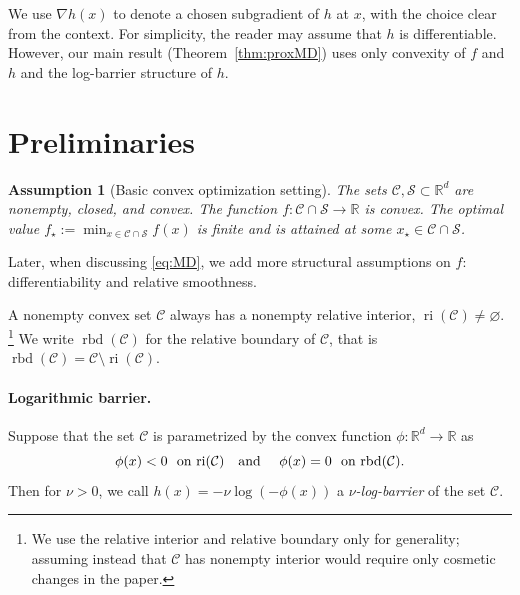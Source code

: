 \documentclass[a4paper]{article}
\newcommand{\CC}{\mathcal{C}}
\renewcommand{\SS}{\mathcal{S}}
\newcommand{\coloneqq}{:=}
\newcommand{\R}{\mathbb{R}}
\DeclareMathOperator{\ri}{ri}
\DeclareMathOperator{\rbd}{rbd}
\newtheorem{assumption}{Assumption}
\begin{document}
We use $\nabla h(x)$ to denote a chosen subgradient of $h$ at $x$, with the choice clear from the context.
For simplicity, the reader may assume that $h$ is differentiable.
However, our main result (Theorem~\ref{thm:proxMD}) uses only convexity of $f$ and $h$ and the log-barrier structure of $h$.

\section{Preliminaries}\label{sec:preliminaries}

\begin{assumption}[Basic convex optimization setting]\label{ass:basic}
        The sets \(\CC, \SS \subset\R^d\) are nonempty, closed, and convex.
        The function \(f\colon \CC \cap \SS \to\R\) is convex.
        The optimal value \(f_\star\coloneqq \min_{x\in\CC\cap \SS} f(x)\)
        is finite and is attained at some \(x_\star\in\CC\cap \SS\).
\end{assumption}
Later, when discussing \eqref{eq:MD}, we add more structural assumptions on $f$: differentiability and relative smoothness.

A nonempty convex set $\CC$ always has a nonempty relative interior, $\ri(\CC)\neq \varnothing$.%
\footnote{We use the relative interior and relative boundary only for generality; assuming instead that $\CC$ has nonempty interior would require only cosmetic changes in the paper.}
We write $\rbd(\CC)$ for the relative boundary of $\CC$, that is $\rbd(\CC) = \CC\setminus \ri(\CC)$. 

\paragraph{Logarithmic barrier.}
Suppose that the set $\CC$ is parametrized by the convex function $\phi\colon \R^d\to \R$ as
\[
\phi(x) <0~~\text{on $\ri(\CC)$\quad  and \quad $\phi(x) = 0$~ on $\rbd(\CC)$}.
\]
Then for $\nu>0$, we call $h(x) = -\nu \log(-\phi(x))$ a \emph{$\nu$-log-barrier} of the set $\CC$. 
\end{document}
